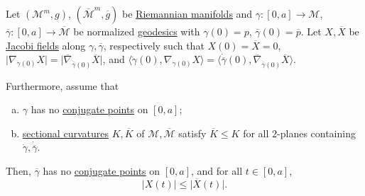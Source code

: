 \begin{theorem}\label{thm:Rauch-comparison}
	Let \((\mathcal{M}^m , g)\), \((\overline{\mathcal{M}}^m , \overline{g})\) be \hyperref[def:Riemannian-manifold]{Riemannian manifolds} and \(\gamma \colon [0, a] \to \mathcal{M} \), \(\overline{\gamma} \colon [0, a] \to \overline{\mathcal{M}} \) be normalized \hyperref[def:geodesic]{geodesics} with \(\gamma (0) = p\), \(\overline{\gamma} (0) = \overline{p} \). Let \(X, \overline{X} \) be \hyperref[def:Jacobi-field]{Jacobi fields} along \(\gamma , \overline{\gamma} \), respectively such that \(X(0) = \overline{X} = 0\), \(\vert \nabla_{\dot{\gamma } (0)} X \vert = \vert \overline{\nabla} _{\dot{\overline{\gamma} } (0)}\overline{X}  \vert\), and \(\langle \dot{\gamma }(0) , \nabla _{\dot{\gamma } (0)} X \rangle = \langle \dot{\overline{\gamma} } (0), \overline{\nabla} _{\dot{\overline{\gamma} } (0)} \overline{X} \rangle \).

	Furthermore, assume that
	\begin{enumerate}[(a)]
		\item \(\gamma \) has no \hyperref[def:conjugate-point]{conjugate points} on \([0, a]\);
		\item \hyperref[def:sectional-curvature]{sectional curvatures} \(K , \overline{K} \) of \(\mathcal{M} , \overline{\mathcal{M}} \) satisfy \(\overline{K} \leq K \) for all \(2\)-planes containing \(\dot{\gamma }, \dot{\overline{\gamma } } \).
	\end{enumerate}

	Then, \(\overline{\gamma} \) has no \hyperref[def:conjugate-point]{conjugate points} on \([0, a]\), and for all \(t\in[0, a]\),
	\[
		\vert X(t) \vert \leq \vert \overline{X} (t) \vert.
	\]
\end{theorem}
